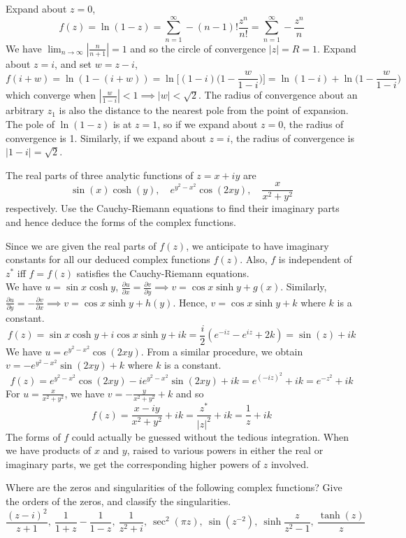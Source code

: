 \documentclass[a4paper]{article}
\begin{document}
\begin{ans}
Expand about $z=0$,
$$f(z)=\ln(1-z)=\sum_{n=1}^\infty-(n-1)!\frac{z^n}{n!}=\sum_{n=1}^\infty -\frac{z^n}{n}$$
We have $\lim_{n\rightarrow\infty}|\frac{n}{n+1}|=1$ and so the circle of convergence $|z|=R=1$. Expand about $z=i$, and set $w=z-i$,
$$f(i+w)=\ln(1-(i+w))=\ln\bigg[(1-i)\bigg(1-\frac{w}{1-i}\bigg)\bigg]=\ln(1-i)+\ln\bigg(1-\frac{w}{1-i}\bigg)$$
which converge when $|\frac{w}{1-i}|<1\implies|w|<\sqrt{2}$. The radius of convergence about an arbitrary $z_1$ is also the distance to the nearest pole from the point of expansion. The pole of $\ln(1-z)$ is at $z=1$, so if we expand about $z=0$, the radius of convergence is 1. Similarly, if we expand about $z=i$, the radius  of convergence is $|1-i|=\sqrt{2}$. 
\end{ans}
\newpage
\begin{qns}
The real parts of three analytic functions of $z=x+iy$ are
$$\sin(x)\cosh(y),\quad e^{y^2-x^2}\cos(2xy),\quad\frac{x}{x^2+y^2}$$
respectively. Use the Cauchy-Riemann equations to find their imaginary parts and hence deduce the forms of the complex functions.
\end{qns}
\begin{ans}
Since we are given the real parts of $f(z)$, we anticipate to have imaginary constants for all our deduced complex functions $f(z)$. Also, $f$ is independent of $z^*$ iff $f=f(z)$ satisfies the Cauchy-Riemann equations.\\[5pt]
We have $u=\sin x\cosh y$, $\frac{\partial u}{\partial x}=\frac{\partial v}{\partial y}\implies v=\cos x\sinh y+g(x)$. Similarly, $\frac{\partial u}{\partial y}=-\frac{\partial v}{\partial x}\implies v=\cos x\sinh y+h(y)$. Hence, $v=\cos x\sinh y+k$ where $k$ is a constant.
$$f(z)=\sin x\cosh y+i\cos x\sinh y+ik=\frac{i}{2}(e^{-iz}-e^{iz}+2k)=\sin(z)+ik$$
We have $u=e^{y^2-x^2}\cos(2xy)$. From a similar procedure, we obtain $v=-e^{y^2-x^2}\sin(2xy)+k$ where $k$ is a constant.
$$f(z)=e^{y^2-x^2}\cos(2xy)-ie^{y^2-x^2}\sin(2xy)+ik=e^{(-iz)^2}+ik=e^{-z^2}+ik$$
For $u=\frac{x}{x^2+y^2}$, we have $v=-\frac{y}{x^2+y^2}+k$ and so
$$f(z)=\frac{x-iy}{x^2+y^2}+ik=\frac{z^*}{|z|^2}+ik=\frac{1}{z}+ik$$
The forms of $f$ could actually be guessed without the tedious integration. When we have products of $x$ and $y$, raised to various powers in either the real or imaginary parts, we get the corresponding higher powers of $z$ involved.
\end{ans}
\begin{qns}
Where are the zeros and singularities of the following complex functions? Give the orders of the zeros, and classify the singularities.
$$\frac{(z-i)^2}{z+1},~\frac{1}{1+z}-\frac{1}{1-z},~\frac{1}{z^2+i},~\sec^2(\pi z),~\sin(z^{-2}),~\sinh\frac{z}{z^2-1},~\frac{\tanh(z)}{z}$$
\end{qns}
\end{document}
